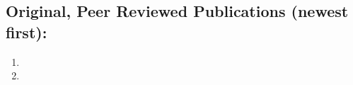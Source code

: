 \documentclass[12pt, letterpaper]{report}   %
\begin{document}
\subsection*{Original, Peer Reviewed Publications (newest first):}
\begin{enumerate}
\item 
\item 
\end{enumerate}
\end{document}
